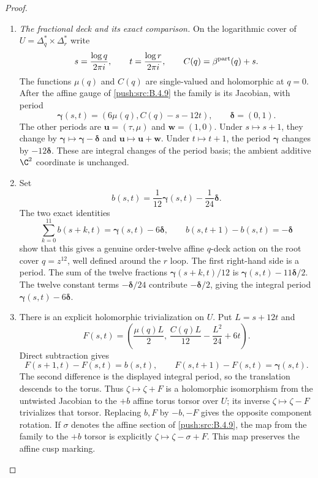 \begin{proof}
\begin{enumerate}[label=\arabic*.,leftmargin=*]
\item \emph{The fractional deck and its exact comparison.}
On the logarithmic cover of
$U=\Delta_q^*\times\Delta_r^*$ write
\[
 s=\frac{\log q}{2\pi i},\qquad
 t=\frac{\log r}{2\pi i},\qquad
 C(q)=\beta^{\rm part}(q)+s.
\]
The functions $\mu(q)$ and $C(q)$ are single-valued
and holomorphic at $q=0$. After the affine gauge of
\ref{push:src:B.4.9} the family is its Jacobian, with period
\begin{equation}
 \boldsymbol\gamma(s,t)
       =(6\mu(q),C(q)-s-12t),\qquad
 \boldsymbol\delta=(0,1).
\label{pub:I:eq:B-4-18-1}
\end{equation}
The other periods are
$\mathbf u=(\tau,\mu)$ and $\mathbf w=(1,0)$.
Under $s\mapsto s+1$, they change by
$\boldsymbol\gamma\mapsto\boldsymbol\gamma-
\boldsymbol\delta$ and $\mathbf u\mapsto\mathbf u+\mathbf w$.
Under $t\mapsto t+1$, the period $\boldsymbol\gamma$
changes by $-12\boldsymbol\delta$.
These are integral changes of the period basis; the
ambient additive $\C^2$ coordinate is unchanged.

\item Set
\[
 b(s,t)=\frac1{12}\boldsymbol\gamma(s,t)
                         -\frac1{24}\boldsymbol\delta.
\]
The two exact identities
\begin{equation}
 \sum_{k=0}^{11}b(s+k,t)
       =\boldsymbol\gamma(s,t)-6\boldsymbol\delta,
 \qquad
 b(s,t+1)-b(s,t)=-\boldsymbol\delta
\label{pub:I:eq:B-4-18-2}
\end{equation}
show that this gives a genuine order-twelve affine
$q$-deck action on the root cover $q=z^{12}$,
well defined around the $r$ loop. The first right-hand
side is a period. The sum of the twelve fractions
$\boldsymbol\gamma(s+k,t)/12$ is
$\boldsymbol\gamma(s,t)-11\boldsymbol\delta/2$.
The twelve constant terms $-\boldsymbol\delta/24$
contribute $-\boldsymbol\delta/2$, giving the integral period
$\boldsymbol\gamma(s,t)-6\boldsymbol\delta$.

\item There is an explicit holomorphic trivialization on $U$.
Put $L=s+12t$ and
\begin{equation}
 F(s,t)=
 \left(\frac{\mu(q)L}{2},\,
       \frac{C(q)L}{12}-\frac{L^2}{24}+6t\right).
\label{pub:I:eq:B-4-18-3}
\end{equation}
Direct subtraction gives
\begin{equation}
 F(s+1,t)-F(s,t)=b(s,t),\qquad
 F(s,t+1)-F(s,t)=\boldsymbol\gamma(s,t).
\label{pub:I:eq:B-4-18-4}
\end{equation}
The second difference is the displayed integral period, so the
translation descends to the torus.
Thus $\zeta\mapsto\zeta+F$ is a holomorphic
isomorphism from the untwisted Jacobian to the
$+b$ affine torus torsor over $U$; its inverse
$\zeta\mapsto\zeta-F$ trivializes that torsor.
Replacing $b,F$ by $-b,-F$ gives the opposite
component rotation. If $\sigma$ denotes the 
affine section of \ref{push:src:B.4.9}, the map from the 
family to the $+b$ torsor is explicitly
$\zeta\mapsto\zeta-\sigma+F$.
This map preserves the affine cusp marking.


\end{enumerate}
\end{proof}
